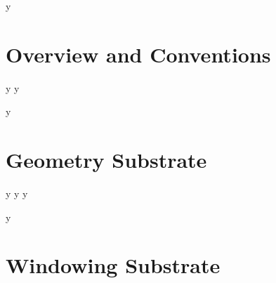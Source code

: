 \author{Working Draft \\
	\\
	Ramana Rao (rao@PARC.Xerox.COM) \\
	Bill York (York@Chuck-Jones.ILA-West.Dialnet.Symbolics.COM) \\ 
	John Aspinall (JGA@Riverside.SCRC.Symbolics.COM) \\
	Scott McKay (SWM@Riverside.SCRC.Symbolics.COM) \\
	Dave Moon (Moon@Riverside.SCRC.Symbolics.COM) \\
	\\
	{\bf **Draft -- Do not distribute**}}

\date{\today}




\addtolength{\oddsidemargin}{-.5in}
\addtolength{\evensidemargin}{-.5in}
\addtolength{\textwidth}{1in}
\addtolength{\topmargin}{-.5in}
\addtolength{\textheight}{1.0in}



\maketitle

\parindent 0pc
\parskip   1pc

\pagebreak
\tableofcontents

\if\doOverviewAndConventions y
 \part{Overview and Conventions}
 \if\doOverview y  \else {} \fi
 \if\doConventions y  \else {} \fi
\else
 \addtocounter{chapter}{2}
 \fi

\if\doGeometrySubstrate y
 \part{Geometry Substrate}
 \if\doGeometry y  \else {} \fi
 \if\doBoundRect y  \else {} \fi
 \if\doTransformations y  \else {} \fi
\else
 \addtocounter{chapter}{3}
 \fi

\if\doWindowingSubstrate y
 \part{Windowing Substrate}
 
\else
 \addtocounter{chapter}{5}
 \fi

